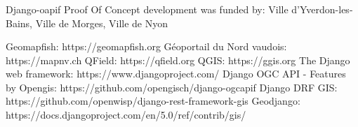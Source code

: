 \documentclass[runningheads]{llncs}
\begin{document}
\begin{credits}
\subsubsection{\ackname} Django-oapif Proof Of Concept development was funded by: Ville d'Yverdon-les-Bains, Ville de Morges, Ville de Nyon

\end{credits}
%
%
%
% 
% 
%
\begin{thebibliography}{8}
Geomapfish: https://geomapfish.org
Géoportail du Nord vaudois: https://mapnv.ch
QField: https://qfield.org
QGIS: https://ggis.org 
The Django web  framework: https://www.djangoproject.com/ 
Django OGC API - Features by Opengis: https://github.com/opengisch/django-ogcapif
Django DRF GIS: https://github.com/openwisp/django-rest-framework-gis
Geodjango: https://docs.djangoproject.com/en/5.0/ref/contrib/gis/



\end{thebibliography}
\end{document}
